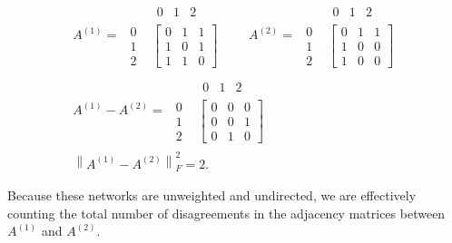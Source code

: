 \begin{align*}
A^{(1)} = 
\begin{array}{cc} &
\begin{array}{ccc} 0 & 1 & 2 \end{array}
\\
\begin{array}{ccc}
0 \\
1 \\
2 \end{array}
&
\left[
\begin{array}{ccc}
0 & 1 & 1\\
1 & 0 & 1\\
1 & 1 & 0\end{array}
\right]\end{array}
\quad \quad
A^{(2)} = 
\begin{array}{cc} &
\begin{array}{ccc} 0 & 1 & 2 \end{array}
\\
\begin{array}{ccc}
0 \\
1 \\
2 \end{array}
&
\left[
\begin{array}{ccc}
0 & 1 & 1\\
1 & 0 & 0\\
1 & 0 & 0\end{array}
\right]\end{array}
\\
A^{(1)} - A^{(2)} =
\begin{array}{cc} &
\begin{array}{ccc} 0 & 1 & 2 \end{array}
\\
\begin{array}{ccc}
0 \\
1 \\
2 \end{array}
&
\left[
\begin{array}{ccc}
0 & 0 & 0\\
0 & 0 & 1\\
0 & 1 & 0\end{array}
\right]\end{array}
\\
\left\|A^{(1)} - A^{(2)}\right\|_F^2 = 2.
\end{align*}

Because these networks are unweighted and undirected, we are effectively counting the total number of disagreements in the adjacency matrices between $A^{(1)}$ and $A^{(2)}$.

